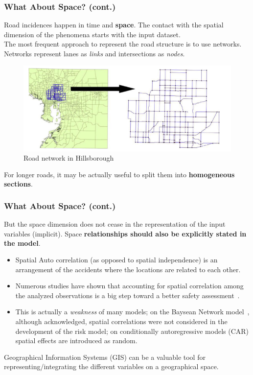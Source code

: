 \documentclass[hyperref={pdfpagelabels=true}]{beamer}
\begin{document}
\begin{frame}
\frametitle{What About Space? (cont.)}
Road incidences happen in time and \textbf{space}. The contact with the spatial dimension of the phenomena starts with the input dataset.\\
The most frequent approach to represent the road structure is to use networks. Networks represent lanes as \textit{links} and intersections as \textit{nodes}.
\begin{figure}
\includegraphics[scale=0.40]{road_network.png}
\caption{\tiny{Road network in  Hillsborough~\cite{zeng}}}
\end{figure}
For longer roads, it may be actually useful to split them into \textbf{homogeneous sections}. %
\end{frame}

\begin{frame}
\frametitle{What About Space? (cont.)}
But the space dimension does not cease in the representation of the input variables (implicit). Space \textbf{relationships should also be explicitly stated in the model}.
\begin{itemize}
\item Spatial Auto correlation (as opposed to spatial independence) is an arrangement of the accidents where the locations are related to each other.
\item Numerous studies have shown that accounting for spatial correlation among the analyzed observations is a big step toward a better safety assessment~\cite{zeng}.
\item This is actually a \textit{weakness} of many models; on the Baysean Network model~\cite{bayesian}, although acknowledged, spatial correlations were not considered in the development of the risk model; on conditionally autoregressive models (CAR) spatial effects are introduced as random.
\end{itemize}
Geographical Information Systems (GIS) can be a valuable tool for representing/integrating the different variables on a geographical space.
\end{frame}
\end{document}
